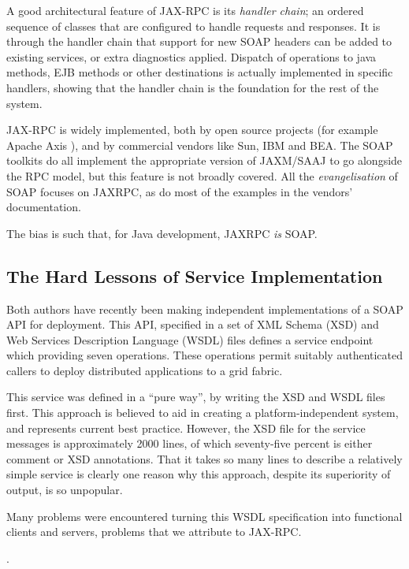 A good architectural feature of JAX-RPC is its \emph{handler chain}; an
ordered sequence of classes that are configured to handle requests and
responses. It is through the handler chain that support for new SOAP
headers can be added to existing services, or extra diagnostics applied.
Dispatch of operations to java methods, EJB methods or other
destinations is actually implemented in specific handlers, showing that
the handler chain is the foundation for the rest of the system.

JAX-RPC is widely implemented, both by open
source projects (for example Apache Axis \cite{axis}), and by
commercial vendors like Sun, IBM and BEA. The SOAP toolkits do all
implement the appropriate version of JAXM/SAAJ to go alongside the RPC
model, but this feature is not broadly covered. All the
\emph{evangelisation} of SOAP focuses on JAXRPC, as do most of the
examples in the vendors' documentation.

The bias is such that, for Java development, JAXRPC \emph{is} SOAP. 

\subsection{The Hard Lessons of Service Implementation}
\label{intro:experience}

Both authors have recently been making independent implementations of
a SOAP API for deployment. This API, specified in a set of XML Schema
(XSD) \cite{spec:XSD} and Web Services Description Language (WSDL)
files \cite{spec:WSDL-11} defines a service endpoint which providing
seven operations. These operations permit suitably authenticated
callers to deploy distributed applications to a grid fabric.

This service was defined in a ``pure way'', by writing the XSD and
WSDL files first. This approach is believed to aid in
creating a platform-independent system, and represents current best
practice. However, the XSD file for the service messages is
approximately 2000 lines, of which seventy-five percent is either
comment or XSD annotations. That it takes so many lines to describe a
relatively simple service is clearly one reason why this approach,
despite its superiority of output, is so unpopular. 

Many problems were encountered turning this WSDL specification into
functional clients and servers, problems that we attribute to JAX-RPC.

.


